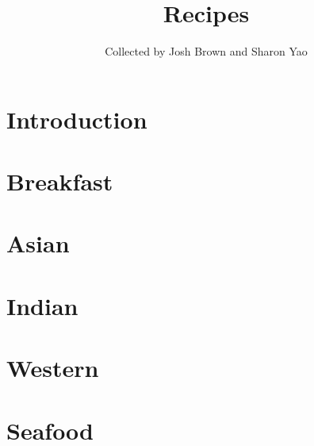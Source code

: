 \documentclass[twoside, 10pt]{book}
\title{\bf \Huge Recipes}
\author{Collected by Josh Brown and Sharon Yao}
\date{}
\begin{document}
\maketitle
\tableofcontents{}

\chapter*{Introduction}
    

\chapter{Breakfast}
    
    
    
    
    
    

\chapter{Asian}
    
    
    
    

\chapter{Indian}
    
    
    
    

\chapter{Western}
    
    
    
    

\chapter{Seafood}
    
    
    
    
    
    
    
\end{document}
